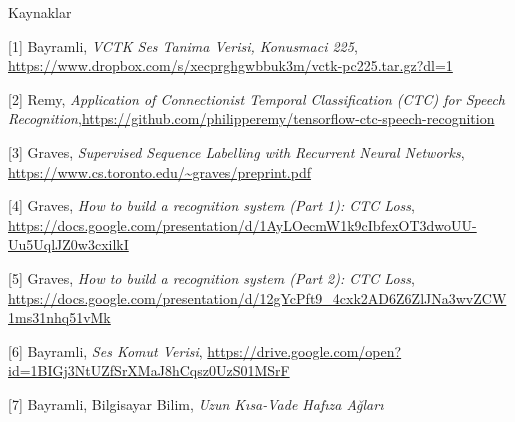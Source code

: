 \documentclass[12pt,fleqn]{article}\usepackage{../../common}
\begin{document}
\inputminted[fontsize=\footnotesize]{python}{train_ctc.py}

Kaynaklar

[1] Bayramli, {\em VCTK Ses Tanima Verisi, Konusmaci 225}, \url{https://www.dropbox.com/s/xecprghgwbbuk3m/vctk-pc225.tar.gz?dl=1}

[2] Remy, {\em Application of Connectionist Temporal Classification (CTC) for Speech Recognition},\url{https://github.com/philipperemy/tensorflow-ctc-speech-recognition}

[3] Graves, {\em Supervised Sequence Labelling with Recurrent Neural Networks}, \url{https://www.cs.toronto.edu/~graves/preprint.pdf}

[4] Graves, {\em How to build a recognition system (Part 1): CTC Loss}, \url{https://docs.google.com/presentation/d/1AyLOecmW1k9cIbfexOT3dwoUU-Uu5UqlJZ0w3cxilkI}

[5] Graves, {\em How to build a recognition system (Part 2): CTC Loss}, \url{https://docs.google.com/presentation/d/12gYcPft9_4cxk2AD6Z6ZlJNa3wvZCW1ms31nhq51vMk}

[6] Bayramli, {\em Ses Komut Verisi}, \url{https://drive.google.com/open?id=1BIGj3NtUZfSrXMaJ8hCqsz0UzS01MSrF}

[7] Bayramli, Bilgisayar Bilim, {\em Uzun Kısa-Vade  Hafıza Ağları}
\end{document}
